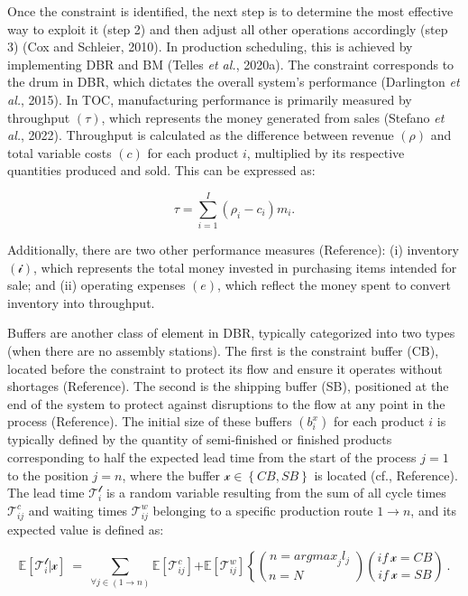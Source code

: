 Once the constraint is identified, the next step is to determine the
most effective way to exploit it (step 2) and then adjust all other
operations accordingly (step 3) (Cox and Schleier, 2010). In production
scheduling, this is achieved by implementing DBR and BM (Telles \emph{et
al.}, 2020a). The constraint corresponds to the drum in DBR, which
dictates the overall system's performance (Darlington \emph{et al.},
2015). In TOC, manufacturing performance is primarily measured by
throughput \((\tau)\), which represents the money generated from sales
(Stefano \emph{et al.}, 2022). Throughput is calculated as the
difference between revenue \((\rho)\) and total variable costs \((c)\)
for each product \(i\), multiplied by its respective quantities produced
and sold. This can be expressed as:

\begin{equation}
\tau = \sum_{i = 1}^{I}{\left( \rho_{i} - c_{i} \right)m_{i}}.
\tag{10}
\end{equation}

Additionally, there are two other performance measures (\colorbox{yellow!40}{Reference}):
(i) inventory \(\mathcal{(i)}\), which represents the total money
invested in purchasing items intended for sale; and (ii) operating
expenses \((e)\), which reflect the money spent to convert inventory
into throughput.

Buffers are another class of element in DBR, typically categorized into
two types (when there are no assembly stations). The first is the
constraint buffer (CB), located before the constraint to protect its
flow and ensure it operates without shortages (\colorbox{yellow!40}{Reference}). The
second is the shipping buffer (SB), positioned at the end of the system
to protect against disruptions to the flow at any point in the process
(\colorbox{yellow!40}{Reference}). The initial size of these buffers
\(\left( b_{i}^{x} \right)\) for each product \(i\) is typically defined
by the quantity of semi-finished or finished products corresponding to
half the expected lead time from the start of the process \(j = 1\) to
the position \(j = n\), where the buffer
\(\mathcal{x} \in \left\{ CB,SB \right\}\) is located (\colorbox{yellow!40}{cf.,
Reference}). The lead time \(\mathcal{T}_{i}^{\mathcal{l}}\) is a random
variable resulting from the sum of all cycle times
\(\mathcal{T}_{ij}^{c}\) and waiting times \(\mathcal{T}_{ij}^{w}\)
belonging to a specific production route \(1 \rightarrow n\), and its
expected value is defined as:

\begin{equation}
\mathbb{E}\left\lbrack \mathcal{T}_{i}^{\mathcal{l}}\mathcal{|x} \right\rbrack\  = \ \sum_{\forall j \in (1 \rightarrow n)}^{}{\mathbb{E}\left\lbrack \mathcal{T}_{ij}^{c} \right\rbrack\mathbb{+ E}\left\lbrack \mathcal{T}_{ij}^{w} \right\rbrack}\left\{ \binom{n = {argmax}_{j}l_{j}\ }{n = N\ \ \ \ \ \ \ \ \ \ \ \ \ \ \ \ \ \ }\binom{if\mathcal{\ x =}CB}{if\mathcal{\ x =}SB} \right.\ .
\tag{11}
\end{equation}

